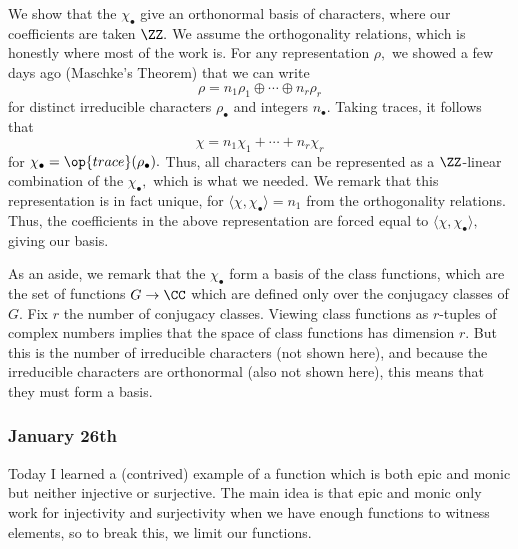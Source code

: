 We show that the $\chi_\bullet$ give an orthonormal basis of characters, where our coefficients are taken $\ZZ.$ We assume the orthogonality relations, which is honestly where most of the work is. For any representation $\rho,$ we showed a few days ago (Maschke’s Theorem) that we can write
\[\rho=n_1\rho_1\oplus\cdots\oplus n_r\rho_r\]
for distinct irreducible characters $\rho_\bullet$ and integers $n_\bullet.$ Taking traces, it follows that
\[\chi=n_1\chi_1+\cdots+n_r\chi_r\]
for $\chi_\bullet=\op{trace}(\rho_\bullet).$ Thus, all characters can be represented as a $\ZZ$-linear combination of the $\chi_\bullet,$ which is what we needed. We remark that this representation is in fact unique, for $\langle\chi,\chi_\bullet\rangle=n_1$ from the orthogonality relations. Thus, the coefficients in the above representation are forced equal to $\langle\chi,\chi_\bullet\rangle,$ giving our basis.

As an aside, we remark that the $\chi_\bullet$ form a basis of the class functions, which are the set of functions $G\to\CC$ which are defined only over the conjugacy classes of $G.$ Fix $r$ the number of conjugacy classes. Viewing class functions as $r$-tuples of complex numbers implies that the space of class functions has dimension $r.$ But this is the number of irreducible characters (not shown here), and because the irreducible characters are orthonormal (also not shown here), this means that they must form a basis.

\subsubsection{January 26th}
Today I learned a (contrived) example of a function which is both epic and monic but neither injective or surjective. The main idea is that epic and monic only work for injectivity and surjectivity when we have enough functions to witness elements, so to break this, we limit our functions.

